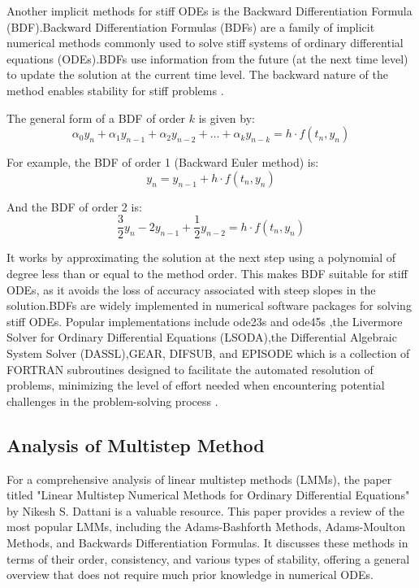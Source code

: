 Another implicit methods for stiff ODEs is the Backward Differentiation Formula (BDF).Backward Differentiation Formulas (BDFs) are a family of implicit numerical methods commonly used to solve stiff systems of ordinary differential equations (ODEs).BDFs use information from the future (at the next time level) to update the solution at the current time level. The backward nature of the method enables stability for stiff problems \cite{numericalrecipes}.

The general form of a BDF of order \(k\) is given by:
\[
\alpha_0 y_n + \alpha_1 y_{n-1} + \alpha_2 y_{n-2} + \ldots + \alpha_k y_{n-k} = h \cdot f(t_n, y_n)
\]

For example, the BDF of order 1 (Backward Euler method) is:
\[
y_n = y_{n-1} + h \cdot f(t_n, y_n)
\]

And the BDF of order 2 is:
\[
\frac{3}{2} y_n - 2y_{n-1} + \frac{1}{2} y_{n-2} = h \cdot f(t_n, y_n)
\]

It works by approximating the solution at the next step using a polynomial of degree less than or equal to the method order. This makes BDF suitable for stiff ODEs, as it avoids the loss of accuracy associated with steep slopes in the solution.BDFs are widely implemented in numerical software packages for solving stiff ODEs. Popular implementations include ode23s and ode45s \cite{shampine1997matlab},the Livermore Solver for Ordinary Differential Equations (LSODA),the Differential Algebraic System Solver (DASSL),GEAR, DIFSUB, and EPISODE \cite{Yatim2013} which is a collection of FORTRAN subroutines designed to facilitate the automated resolution of problems, minimizing the level of effort needed when encountering potential challenges in the problem-solving process \cite{thohura2013numerical}.


\subsection{Analysis of Multistep Method}

For a comprehensive analysis of linear multistep methods (LMMs), the paper titled "Linear Multistep Numerical Methods for Ordinary Differential Equations" by Nikesh S. Dattani is a valuable resource. This paper provides a review of the most popular LMMs, including the Adams-Bashforth Methods, Adams-Moulton Methods, and Backwards Differentiation Formulas. It discusses these methods in terms of their order, consistency, and various types of stability, offering a general overview that does not require much prior knowledge in numerical ODEs\cite{dattani2008linear}.

